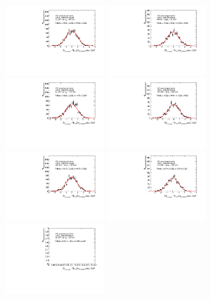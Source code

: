 \begin{figure}
\includegraphics[width=0.33\textwidth]{fig/UnfoldPull/SingleSlicePull24.pdf}
\includegraphics[width=0.33\textwidth]{fig/UnfoldPull/SingleSlicePull25.pdf}
%
\includegraphics[width=0.33\textwidth]{fig/UnfoldPull/SingleSlicePull26.pdf}
\includegraphics[width=0.33\textwidth]{fig/UnfoldPull/SingleSlicePull27.pdf}
\includegraphics[width=0.33\textwidth]{fig/UnfoldPull/SingleSlicePull28.pdf}
%
\includegraphics[width=0.33\textwidth]{fig/UnfoldPull/SingleSlicePull29.pdf}
\includegraphics[width=0.33\textwidth]{fig/UnfoldPull/SingleSlicePull30.pdf}

\end{figure}
